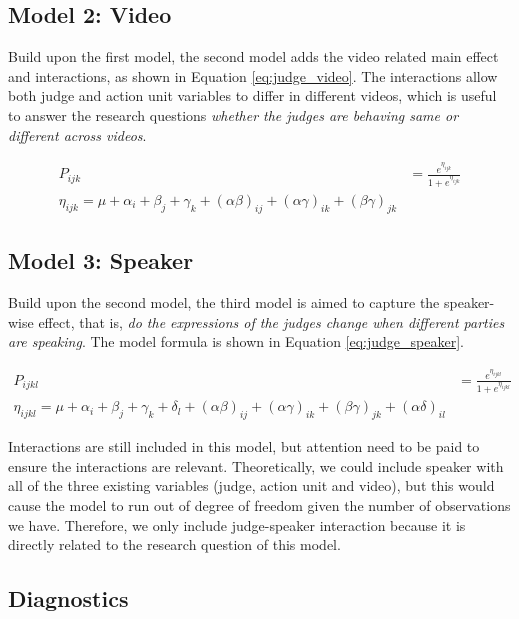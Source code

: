 \documentclass{monashthesis}
\begin{document}
\hypertarget{model-2-video}{%
\subsection{Model 2: Video}\label{model-2-video}}

Build upon the first model, the second model adds the video related main effect and interactions, as shown in Equation \ref{eq:judge_video}. The interactions allow both judge and action unit variables to differ in different videos, which is useful to answer the research questions \emph{whether the judges are behaving same or different across videos}.

\begin{align}\label{eq:judge_video}
P_{ijk} &= \frac{e^{\eta_{ijk}}}{1 + e^{\eta_{ijk}}} \\
\eta_{ijk} = \mu + \alpha_i + \beta_j +\gamma_k + (\alpha\beta)_{ij} + (\alpha\gamma)_{ik} + (\beta\gamma)_{jk}
\end{align}

\noindent 

\hypertarget{model-3-speaker}{%
\subsection{Model 3: Speaker}\label{model-3-speaker}}

Build upon the second model, the third model is aimed to capture the speaker-wise effect, that is, \emph{do the expressions of the judges change when different parties are speaking}. The model formula is shown in Equation \ref{eq:judge_speaker}.

\begin{align}\label{eq:judge_speaker}
P_{ijkl} &= \frac{e^{\eta_{ijkl}}}{1 + e^{\eta_{ijkl}}} \\
\eta_{ijkl} = \mu + \alpha_i + \beta_j +\gamma_k + \delta_l + (\alpha\beta)_{ij} + (\alpha\gamma)_{ik} + (\beta\gamma)_{jk} + (\alpha\delta)_{il}
\end{align}

Interactions are still included in this model, but attention need to be paid to ensure the interactions are relevant. Theoretically, we could include speaker with all of the three existing variables (judge, action unit and video), but this would cause the model to run out of degree of freedom given the number of observations we have. Therefore, we only include judge-speaker interaction because it is directly related to the research question of this model.

\hypertarget{diagnostics}{%
\subsection{Diagnostics}\label{diagnostics}}
\end{document}
